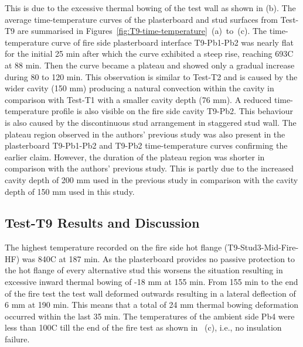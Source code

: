 This is due to the excessive thermal bowing of the test wall as shown in  (b). The average time-temperature curves of the plasterboard and stud surfaces from Test-T9 are summarised in Figures~\ref{fig:T9-time-temperature}~(a)~to~(c). The time-temperature curve of fire side plasterboard interface T9-Pb1-Pb2 was nearly flat for the initial 25 min after which the curve exhibited a steep rise, reaching 693\degree C at 88 min. Then the curve became a plateau and showed only a gradual increase during 80 to 120 min. This observation is similar to Test-T2 and is caused by the wider cavity (150 mm) producing a natural convection within the cavity in comparison with Test-T1 with a smaller cavity depth (76 mm). A reduced time-temperature profile is also visible on the fire side cavity T9-Pb2. This behaviour is also caused by the discontinuous stud arrangement in staggered stud wall. The plateau region observed in the authors' previous study \citet{Magarabooshanam2019} was also present in the plasterboard T9-Pb1-Pb2 and T9-Pb2 time-temperature curves confirming the earlier claim. However, the duration of the plateau region was shorter in comparison with the authors' previous study. This is partly due to the increased cavity depth of 200 mm used in the previous study in comparison with the cavity depth of 150 mm used in this study.  

\subsection{Test-T9 Results and Discussion}

The highest temperature recorded on the fire side hot flange (T9-Stud3-Mid-Fire-HF) was 840\degree C at 187 min. As the plasterboard provides no passive protection to the hot flange of every alternative stud this worsens the situation resulting in excessive inward thermal bowing of -18 mm at 155 min. From 155 min to the end of the fire test the test wall deformed outwards resulting in a lateral deflection of 6 mm at 190 min. This means that a total of 24 mm thermal bowing deformation occurred within the last 35 min. The temperatures of the ambient side Pb4 were less than 100\degree C till the end of the fire test as shown in ~(c), i.e., no insulation failure. 
 
